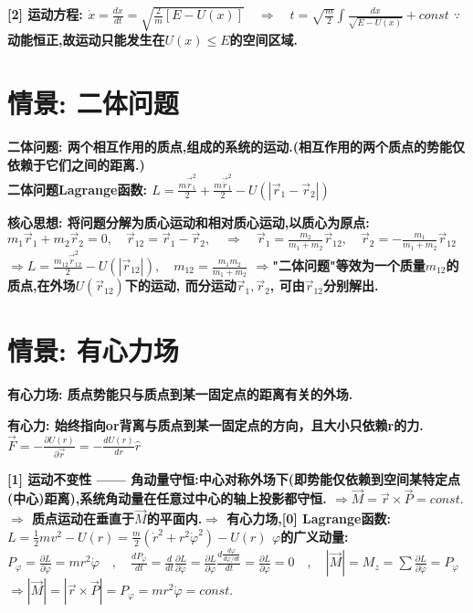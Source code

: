         \bf{[2] 运动方程}:
            $\dot x = \frac{dx}{dt} = \sqrt{\frac{2}{m}[E - U(x)]}\quad \Rightarrow \quad t = \sqrt{\frac{m}{2}} \int \frac{dx}{\sqrt{E - U(x)}} + const$
            $\because$动能恒正,故运动只能发生在$U(x) \leqslant E$的空间区域.


    \section{情景: 二体问题}
        \bf{二体问题}: 两个相互作用的质点,组成的系统的运动.(相互作用的两个质点的势能仅依赖于它们之间的距离.)\\
        二体问题Lagrange函数:
            $L = \frac{m \vec \dot r_1^2}{2} + \frac{m \vec \dot r_1^2}{2} - U(|\vec r_1 - \vec r_2|)$
        
        \bf{核心思想}: 将问题分解为\bf{质心运动}和\bf{相对质心运动},以质心为原点:
            $m_1\vec r_1 + m_2 \vec r_2 =0,\quad \vec r_{12} = \vec r_1 - \vec r_2, \quad \Rightarrow \quad \vec r_1 = \frac{m_2}{m_1 + m_2}\vec r_{12}, \quad \vec r_2 = - \frac{m_1}{m_1 + m_2}\vec r_{12} $
            $\Rightarrow L = \frac{m_{12} \vec \dot r_{12}^2}{2} - U(|\vec r_{12}|), \quad m_{12} = \frac{m_1 m_2}{m_1 + m_2}$
            $\Rightarrow$"二体问题"等效为一个质量$m_{12}$的质点,在外场$U(\vec r_{12})$下的运动, 而分运动$\vec r_1, \vec r_2$, 可由$\vec r_{12}$分别解出.
        
        
    \section{情景: 有心力场}
        \bf{有心力场}: 质点势能只与质点到某一固定点的距离有关的外场.
        
        \bf{有心力}: 始终指向or背离与质点到某一固定点的方向，且大小只依赖r的力.
            $\vec F = -\frac{\partial U(r)}{\partial \vec r} = -\frac{d U(r)}{d r} \hat r$
    
        \bf{[1] 运动不变性 —— 角动量守恒}:中心对称外场下(即势能仅依赖到空间某特定点(中心)距离),系统角动量在任意过中心的轴上投影都守恒.
            $\Rightarrow \vec M = \vec r \times \vec P = const.$
            $\Rightarrow$ 质点运动在垂直于$\vec M$的平面内.\quad $\Rightarrow$ 有心力场,\bf{[0] Lagrange函数}:
            $L = \frac{1}{2}m v^2 - U(r) = \frac{m}{2} (\dot r^2 + r^2 \dot \varphi ^2) - U(r)$
            $\varphi$的广义动量:
            $P_\varphi = \frac{\partial L}{\partial \dot \varphi} = m r^2 \dot \varphi \quad , \quad \frac{d P_\varphi}{d t} = \frac{d}{d t}\frac{\partial L}{\partial \dot \varphi} = \frac{\partial L}{\partial \varphi} \frac{d \frac{d \varphi}{d \varphi / d t}}{d t} = \frac{\partial L}{\partial \varphi} = 0 \quad , \quad |\vec M| = M_z = \sum \frac{\partial L}{\partial  \dot \varphi} = P_\varphi$
            $\Rightarrow |\vec M| =| \vec r \times \vec P |= P_\varphi = m r^2 \dot \varphi = const.$
    
